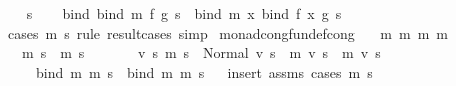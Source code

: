 \begin{isabellebody}
%
\isadelimproof
%
\endisadelimproof
%
\isatagproof
{}\isamarkupfalse%
\isanewline
\ \ \isamarkupfalse%
\ s\isanewline
\ \ \isamarkupfalse%
\ {\isachardoublequoteopen}bind\ {\isacharparenleft}{\kern0pt}bind\ m\ f{\isacharparenright}{\kern0pt}\ g\ s\ {\isacharequal}{\kern0pt}\ bind\ m\ {\isacharparenleft}{\kern0pt}{\isasymlambda}x{\isachardot}{\kern0pt}\ bind\ {\isacharparenleft}{\kern0pt}f\ x{\isacharparenright}{\kern0pt}\ g{\isacharparenright}{\kern0pt}\ s{\isachardoublequoteclose}\isanewline
\ \ \ \ \isamarkupfalse%
\ {\isacharparenleft}{\kern0pt}cases\ {\isachardoublequoteopen}m\ s{\isachardoublequoteclose}\ rule{\isacharcolon}{\kern0pt}\ result{\isacharunderscore}{\kern0pt}cases{\isacharcomma}{\kern0pt}\ simp{\isacharplus}{\kern0pt}{\isacharparenright}{\kern0pt}\isanewline
{}\isamarkupfalse%
%
\endisatagproof
{\isafoldproof}%
%
\isadelimproof
%
\endisadelimproof
%
\isadelimdocument
%
\endisadelimdocument
%
\isatagdocument
%
\isamarkuptrue%
%
\endisatagdocument
{\isafolddocument}%
%
\isadelimdocument
%
\endisadelimdocument
{}\isamarkupfalse%
\ monad{\isacharunderscore}{\kern0pt}cong{\isacharbrackleft}{\kern0pt}fundef{\isacharunderscore}{\kern0pt}cong{\isacharbrackright}{\kern0pt}{\isacharcolon}{\kern0pt}\isanewline
\ \ \ m{}\ m{}\ m{}\ m{}\isanewline
\ \ \ {\isachardoublequoteopen}m{}\ s\ {\isacharequal}{\kern0pt}\ m{}\ s{\isachardoublequoteclose}\isanewline
\ \ \ \ \ \ \ {\isachardoublequoteopen}{\isasymAnd}v\ s{\isacharprime}{\kern0pt}{\isachardot}{\kern0pt}\ m{}\ s\ {\isacharequal}{\kern0pt}\ Normal\ {\isacharparenleft}{\kern0pt}v{\isacharcomma}{\kern0pt}\ s{\isacharprime}{\kern0pt}{\isacharparenright}{\kern0pt}\ {\isasymLongrightarrow}\ m{}\ v\ s{\isacharprime}{\kern0pt}\ {\isacharequal}{\kern0pt}\ m{}\ v\ s{\isacharprime}{\kern0pt}{\isachardoublequoteclose}\isanewline
\ \ \ \ \ {\isachardoublequoteopen}{\isacharparenleft}{\kern0pt}bind\ m{}\ m{}{\isacharparenright}{\kern0pt}\ s\ {\isacharequal}{\kern0pt}\ {\isacharparenleft}{\kern0pt}bind\ m{}\ m{}{\isacharparenright}{\kern0pt}\ s{\isachardoublequoteclose}\isanewline
%
\isadelimproof
\ \ %
\endisadelimproof
%
\isatagproof
{}\isamarkupfalse%
{\isacharparenleft}{\kern0pt}insert\ assms{\isacharcomma}{\kern0pt}\ cases\ {\isachardoublequoteopen}m{}\ s{\isachardoublequoteclose}{\isacharparenright}{\kern0pt}\isanewline

\end{isabellebody}
